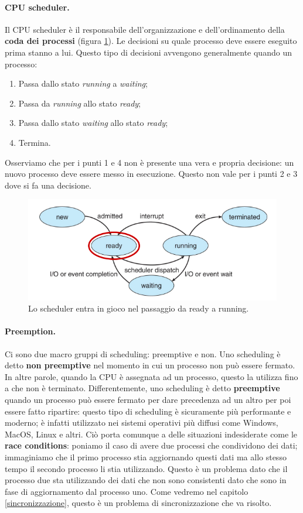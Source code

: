 \paragraph{CPU scheduler.}
Il CPU scheduler è il responsabile dell'organizzazione e dell'ordinamento della \textbf{coda dei processi} (figura \ref{fig:process'life}). Le decisioni su quale processo deve essere eseguito prima stanno a lui. Questo tipo di decisioni avvengono generalmente quando un processo:
\vspace{-5px}
\begin{enumerate}
\setlength{\itemsep}{-.15 em}
    \item Passa dallo stato \textit{running} a \textit{waiting};
    \item Passa da \textit{running} allo stato \textit{ready};
    \item Passa dallo stato \textit{waiting} allo stato \textit{ready};
    \item Termina.
\vspace{-5px}
\end{enumerate}
Osserviamo che per i punti 1 e 4 non è presente una vera e propria decisione: un nuovo processo deve essere messo in esecuzione. Questo non vale per i punti 2 e 3 dove si fa una decisione.
\begin{figure}[h]
    \centering
    \includegraphics[width = .65\textwidth]{../res/imgs/CPU scheduling/dispatcher.png}
    \caption{Lo scheduler entra in gioco nel passaggio da ready a running.}
    \label{fig:process'life}
\end{figure}
% 
\paragraph{Preemption.}
Ci sono due macro gruppi di scheduling: preemptive e non. Uno scheduling è detto \textbf{non preemptive} nel momento in cui un processo non può essere fermato. In altre parole, quando la CPU è assegnata ad un processo, questo la utilizza fino a che non è terminato. Differentemente, uno scheduling è detto \textbf{preemptive} quando un processo può essere fermato per dare precedenza ad un altro per poi essere fatto ripartire: questo tipo di scheduling è sicuramente più performante e moderno; è infatti utilizzato nei sistemi operativi più diffusi come Windows, MacOS, Linux e altri. Ciò porta comunque a delle situazioni indesiderate come le \textbf{race conditions}: poniamo il caso di avere due processi che condividono dei dati; immaginiamo che il primo processo stia aggiornando questi dati ma allo stesso tempo il secondo processo li stia utilizzando. Questo è un problema dato che il processo due sta utilizzando dei dati che non sono consistenti dato che sono in fase di aggiornamento dal processo uno. Come vedremo nel capitolo \ref{sincronizzazione}, questo è un problema di sincronizzazione che va risolto.
% 
